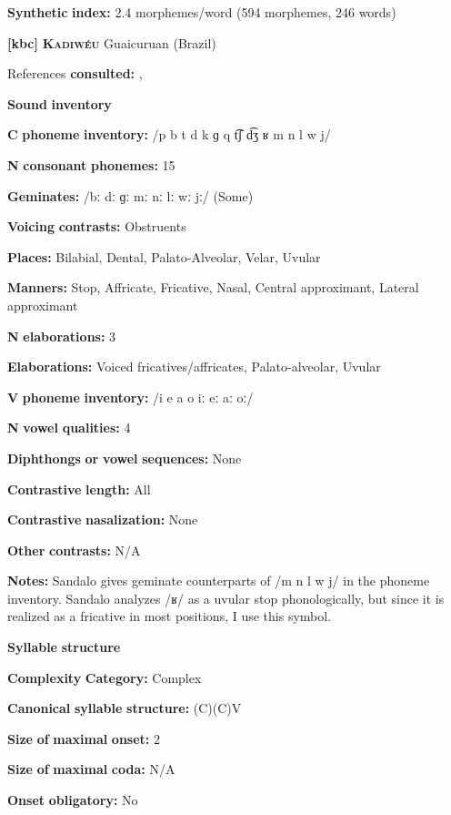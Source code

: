 \textbf{Synthetic} \textbf{index:} 2.4 morphemes/word (594 morphemes, 246 words)

\textbf{[kbc]}   \textbf{\textsc{Kadiwéu}}  Guaicuruan (Brazil)

References \textbf{consulted:} \citet{Braggio1981}, \citet{Sandalo1997}

\textbf{Sound} \textbf{inventory}

\textbf{C} \textbf{phoneme} \textbf{inventory:} /p b t d k ɡ q t͡ʃ d͡ʒ ʁ m n l w j/

\textbf{N} \textbf{consonant} \textbf{phonemes:} 15

\textbf{Geminates:} /bː dː ɡː mː nː lː wː jː/ (Some)

\textbf{Voicing} \textbf{contrasts:} Obstruents

\textbf{Places:} Bilabial, Dental, Palato-Alveolar, Velar, Uvular

\textbf{Manners:} Stop, Affricate, Fricative, Nasal, Central approximant, Lateral approximant

\textbf{N} \textbf{elaborations:} 3

\textbf{Elaborations:} Voiced fricatives/affricates, Palato-alveolar, Uvular

\textbf{V} \textbf{phoneme} \textbf{inventory:} /i e a o iː eː aː oː/

\textbf{N} \textbf{vowel} \textbf{qualities:} 4

\textbf{Diphthongs} \textbf{or} \textbf{vowel} \textbf{sequences:} None

\textbf{Contrastive} \textbf{length:} All

\textbf{Contrastive} \textbf{nasalization:} None

\textbf{Other} \textbf{contrasts:} N/A

\textbf{Notes:} Sandalo gives geminate counterparts of /m n l w j/ in the phoneme inventory. Sandalo analyzes /ʁ/ as a uvular stop phonologically, but since it is realized as a fricative in most positions, I use this symbol.

\textbf{Syllable} \textbf{structure}

\textbf{Complexity} \textbf{Category:} Complex

\textbf{Canonical} \textbf{syllable} \textbf{structure:} (C)(C)V \citep[17-18]{Sandalo1997}

\textbf{Size} \textbf{of} \textbf{maximal} \textbf{onset:} 2

\textbf{Size} \textbf{of} \textbf{maximal} \textbf{coda:} N/A

\textbf{Onset} \textbf{obligatory:} No

